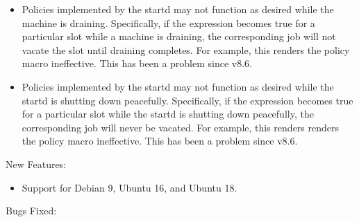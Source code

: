 \begin{itemize}

\item Policies implemented by the startd may not function as desired while
the machine is draining.  Specifically, if the  expression
becomes true for a particular slot while a machine is draining, the
corresponding job will not vacate the slot until draining completes.  For
example, this renders the policy macro 
ineffective.  This has been a problem since v8.6.

\item Policies implemented by the startd may not function as desired while
the startd is shutting down peacefully.  Specifically, if the 
expression becomes true for a particular slot while the startd is shutting
down peacefully, the corresponding job will never be vacated.  For example,
this renders renders the policy macro 
ineffective.  This has been a problem since v8.6.

\end{itemize}

\noindent New Features:

\begin{itemize}

\item Support for Debian 9, Ubuntu 16, and Ubuntu 18.

\end{itemize}

\noindent Bugs Fixed:

